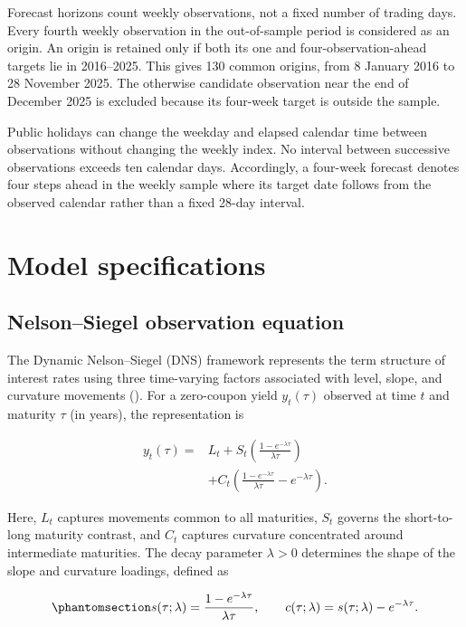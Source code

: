 \documentclass[
  12pt,
  letterpaper,
  DIV=11,
  numbers=noendperiod]{scrreprt}
\begin{document}
Forecast horizons count weekly observations, not a fixed number of
trading days. Every fourth weekly observation in the out-of-sample
period is considered as an origin. An origin is retained only if both
its one and four-observation-ahead targets lie in 2016--2025. This gives
130 common origins, from 8 January 2016 to 28 November 2025. The
otherwise candidate observation near the end of December 2025 is
excluded because its four-week target is outside the sample.

Public holidays can change the weekday and elapsed calendar time between
observations without changing the weekly index. No interval between
successive observations exceeds ten calendar days. Accordingly, a
four-week forecast denotes four steps ahead in the weekly sample where
its target date follows from the observed calendar rather than a fixed
28-day interval.

\chapter{Model specifications}\label{sec-methods}

\section{Nelson--Siegel observation
equation}\label{nelsonsiegel-observation-equation}

The Dynamic Nelson--Siegel (DNS) framework represents the term structure
of interest rates using three time-varying factors associated with
level, slope, and curvature movements
(). For a
zero-coupon yield \(y_t(\tau)\) observed at time \(t\) and maturity
\(\tau\) (in years), the representation is

\[
\begin{aligned}
y_t(\tau)={}&L_t
+S_t\left(\frac{1-e^{-\lambda\tau}}{\lambda\tau}\right)\\
&+C_t\left(\frac{1-e^{-\lambda\tau}}{\lambda\tau}-e^{-\lambda\tau}\right).
\end{aligned}
\]

Here, \(L_t\) captures movements common to all maturities, \(S_t\)
governs the short-to-long maturity contrast, and \(C_t\) captures
curvature concentrated around intermediate maturities. The decay
parameter \(\lambda>0\) determines the shape of the slope and curvature
loadings, defined as

\begin{equation}\protect\phantomsection\label{eq-loadings}{
s(\tau;\lambda)=\frac{1-e^{-\lambda\tau}}{\lambda\tau},
\qquad
c(\tau;\lambda)=s(\tau;\lambda)-e^{-\lambda\tau}.
}\end{equation}
\end{document}
